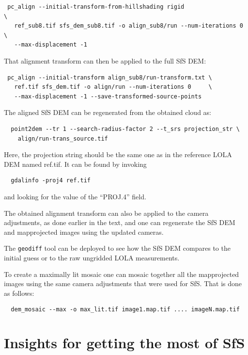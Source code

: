 \begin{verbatim}
 pc_align --initial-transform-from-hillshading rigid                  \
   ref_sub8.tif sfs_dem_sub8.tif -o align_sub8/run --num-iterations 0 \
   --max-displacement -1
\end{verbatim}

That alignment transform can then be applied to the full SfS DEM:

\begin{verbatim}
 pc_align --initial-transform align_sub8/run-transform.txt \
   ref.tif sfs_dem.tif -o align/run --num-iterations 0     \
   --max-displacement -1 --save-transformed-source-points
\end{verbatim}

The aligned SfS DEM can be regenerated from the obtained cloud as:

\begin{verbatim}
  point2dem --tr 1 --search-radius-factor 2 --t_srs projection_str \
    align/run-trans_source.tif
\end{verbatim}

Here, the projection string should be the same one as in the reference 
LOLA DEM named ref.tif. It can be found by invoking 

\begin{verbatim}
  gdalinfo -proj4 ref.tif
\end{verbatim}

and looking for the value of the ``PROJ.4'' field.

The obtained alignment transform can also be applied to the camera
adjustments, as done earlier in the text, and one can regenerate the SfS
DEM and mapprojected images using the updated cameras.

The \texttt{geodiff} tool can be deployed to see how the SfS DEM
compares to the initial guess or to the raw ungridded LOLA measurements.

To create a maximally lit mosaic one can mosaic together all the mapprojected
images using the same camera adjustments that were used for SfS. That is
done as follows:
\begin{verbatim}
  dem_mosaic --max -o max_lit.tif image1.map.tif .... imageN.map.tif
\end{verbatim}

\section{Insights for getting the most of SfS}
\label{sfs:insights}

